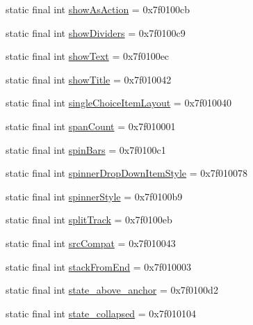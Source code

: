 \begin{CompactItemize}
\item 
static final int \hyperlink{classandroid_1_1support_1_1coreutils_1_1_r_1_1attr_3b266cf47708132d77f78aa2a38973a0}{showAsAction} = 0x7f0100cb
\item 
static final int \hyperlink{classandroid_1_1support_1_1coreutils_1_1_r_1_1attr_a6a9e189da3cea374ceb924685041299}{showDividers} = 0x7f0100c9
\item 
static final int \hyperlink{classandroid_1_1support_1_1coreutils_1_1_r_1_1attr_cf3fad8afd744b3819277f49428762d2}{showText} = 0x7f0100ec
\item 
static final int \hyperlink{classandroid_1_1support_1_1coreutils_1_1_r_1_1attr_b7dba8040c410734ef52a944b66c3285}{showTitle} = 0x7f010042
\item 
static final int \hyperlink{classandroid_1_1support_1_1coreutils_1_1_r_1_1attr_68c35e6a181ad9a28ed21f0421c24071}{singleChoiceItemLayout} = 0x7f010040
\item 
static final int \hyperlink{classandroid_1_1support_1_1coreutils_1_1_r_1_1attr_3cebbb0d000adb605f871a44d6b494bf}{spanCount} = 0x7f010001
\item 
static final int \hyperlink{classandroid_1_1support_1_1coreutils_1_1_r_1_1attr_1c04ac3917b9d0cd52af3541bfcf5265}{spinBars} = 0x7f0100c1
\item 
static final int \hyperlink{classandroid_1_1support_1_1coreutils_1_1_r_1_1attr_762705f0f52f81ed54d6bef82373e5ed}{spinnerDropDownItemStyle} = 0x7f010078
\item 
static final int \hyperlink{classandroid_1_1support_1_1coreutils_1_1_r_1_1attr_39f3b67edbf8665e31c36598de65a753}{spinnerStyle} = 0x7f0100b9
\item 
static final int \hyperlink{classandroid_1_1support_1_1coreutils_1_1_r_1_1attr_c6a7136ce80abcf53f741ecccd349911}{splitTrack} = 0x7f0100eb
\item 
static final int \hyperlink{classandroid_1_1support_1_1coreutils_1_1_r_1_1attr_be605f85b218d99cae4aed852e0b8274}{srcCompat} = 0x7f010043
\item 
static final int \hyperlink{classandroid_1_1support_1_1coreutils_1_1_r_1_1attr_8d090a4a9670d9d0993ad9e21d6b1902}{stackFromEnd} = 0x7f010003
\item 
static final int \hyperlink{classandroid_1_1support_1_1coreutils_1_1_r_1_1attr_690db2f579732162147ef4910f4edb10}{state\_\-above\_\-anchor} = 0x7f0100d2
\item 
static final int \hyperlink{classandroid_1_1support_1_1coreutils_1_1_r_1_1attr_41c0b4fb742ce2a9b950e49db2d3b62c}{state\_\-collapsed} = 0x7f010104

\end{CompactItemize}

